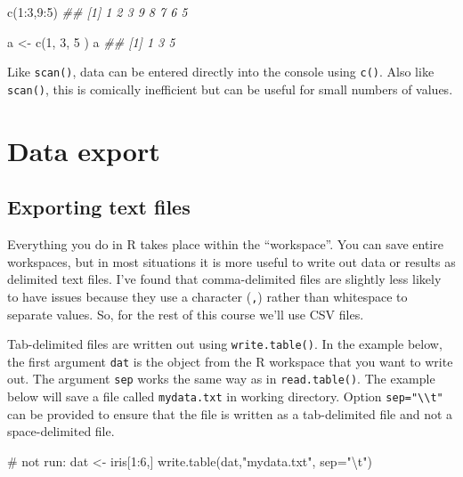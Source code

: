 \documentclass[
  13,
  letterpaper,
]{report}
\newenvironment{Shaded}{\begin{snugshade}}{\end{snugshade}}
\newcommand{\AttributeTok}[1]{\textcolor[rgb]{0.40,0.45,0.13}{#1}}
\newcommand{\CommentTok}[1]{\textcolor[rgb]{0.37,0.37,0.37}{#1}}
\newcommand{\DecValTok}[1]{\textcolor[rgb]{0.68,0.00,0.00}{#1}}
\newcommand{\DocumentationTok}[1]{\textcolor[rgb]{0.37,0.37,0.37}{\textit{#1}}}
\newcommand{\FunctionTok}[1]{\textcolor[rgb]{0.28,0.35,0.67}{#1}}
\newcommand{\NormalTok}[1]{\textcolor[rgb]{0.00,0.23,0.31}{#1}}
\newcommand{\OtherTok}[1]{\textcolor[rgb]{0.00,0.23,0.31}{#1}}
\newcommand{\SpecialCharTok}[1]{\textcolor[rgb]{0.37,0.37,0.37}{#1}}
\newcommand{\StringTok}[1]{\textcolor[rgb]{0.13,0.47,0.30}{#1}}
\begin{document}
\begin{Shaded}
\begin{Highlighting}[]

\FunctionTok{c}\NormalTok{(}\DecValTok{1}\SpecialCharTok{:}\DecValTok{3}\NormalTok{,}\DecValTok{9}\SpecialCharTok{:}\DecValTok{5}\NormalTok{)}
\DocumentationTok{\#\# [1] 1 2 3 9 8 7 6 5}

\NormalTok{a }\OtherTok{\textless{}{-}} \FunctionTok{c}\NormalTok{(}\DecValTok{1}\NormalTok{,}
      \DecValTok{3}\NormalTok{,}
       \DecValTok{5}
\NormalTok{       )}
\NormalTok{a}
\DocumentationTok{\#\# [1] 1 3 5}
\end{Highlighting}
\end{Shaded}

Like \texttt{scan()}, data can be entered directly into the console
using \texttt{c()}. Also like \texttt{scan()}, this is comically
inefficient but can be useful for small numbers of values.

\section{Data export}\label{sec-ie-export}

\subsection{Exporting text files}\label{sec-ie-export-text}

Everything you do in R takes place within the ``workspace''. You can
save entire workspaces, but in most situations it is more useful to
write out data or results as delimited text files. I've found that
comma-delimited files are slightly less likely to have issues because
they use a character (\texttt{,}) rather than whitespace to separate
values. So, for the rest of this course we'll use CSV files.

Tab-delimited files are written out using \texttt{write.table()}. In the
example below, the first argument \texttt{dat} is the object from the R
workspace that you want to write out. The argument \texttt{sep} works
the same way as in \texttt{read.table()}. The example below will save a
file called \texttt{mydata.txt} in working directory. Option
\texttt{sep="\textbackslash{}\textbackslash{}t"} can be provided to
ensure that the file is written as a tab-delimited file and not a
space-delimited file.

\begin{Shaded}
\begin{Highlighting}[]
\CommentTok{\# not run:}
\NormalTok{dat }\OtherTok{\textless{}{-}}\NormalTok{ iris[}\DecValTok{1}\SpecialCharTok{:}\DecValTok{6}\NormalTok{,]}
\FunctionTok{write.table}\NormalTok{(dat,}\StringTok{"mydata.txt"}\NormalTok{, }\AttributeTok{sep=}\StringTok{"}\SpecialCharTok{\textbackslash{}t}\StringTok{"}\NormalTok{)}
\end{Highlighting}
\end{Shaded}
\end{document}
